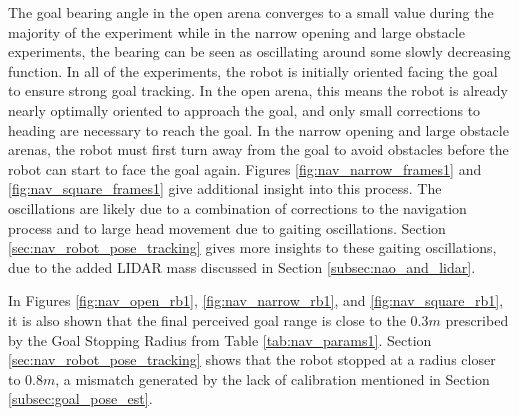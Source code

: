 The goal bearing angle in the open arena converges to a small value during the majority of the experiment
while in the narrow opening and large obstacle experiments, the bearing can be seen as oscillating
around some slowly decreasing function. In all of the experiments, the robot is initially oriented facing the goal
to ensure strong goal tracking. In the open arena, this means the robot is already nearly optimally oriented
to approach the goal, and only small corrections to heading are necessary to reach the goal.
In the narrow opening and large obstacle arenas, the robot must first turn away from the goal to
avoid obstacles before the robot can start to face the goal again. Figures \ref{fig:nav_narrow_frames1}
and \ref{fig:nav_square_frames1} give additional insight into this process.
The oscillations are likely due to a combination of corrections to the navigation process
and to large head movement due to gaiting oscillations. Section \ref{sec:nav_robot_pose_tracking} gives
more insights to these gaiting oscillations, due to the added LIDAR mass discussed in Section 
\ref{subsec:nao_and_lidar}.


In Figures \ref{fig:nav_open_rb1}, \ref{fig:nav_narrow_rb1}, and \ref{fig:nav_square_rb1},
it is also shown that the final perceived goal range is close to the $0.3 m$ prescribed by the Goal Stopping
Radius from Table \ref{tab:nav_params1}. Section \ref{sec:nav_robot_pose_tracking} shows that the robot
stopped at a radius closer to $0.8 m$, a mismatch generated by the lack of calibration mentioned in
Section \ref{subsec:goal_pose_est}.

